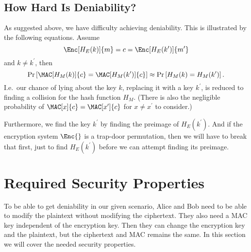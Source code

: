 \subsection{How Hard Is Deniability?}
\label{HardnessOfDeniability}

As suggested above, we have difficulty achieving deniability.
This is illustrated by the following equations.
Assume
\begin{equation*}
  \Enc[H_E(k)]{m} = c = \Enc[H_E(k^\prime)]{m^\prime}
\end{equation*}
and \(k\neq k^\prime\), then
\begin{equation*}
  \Pr\left[
    \MAC[H_M(k)]{c} = \MAC[H_M(k^\prime)]{c}
  \right]
  \approx
  \Pr\left[ H_M(k) = H_M(k^\prime) \right].
\end{equation*}
I.e.~our chance of lying about the key \(k\), replacing it with a key 
\(k^\prime\), is reduced to finding a collision for the hash function \(H_M\).
(There is also the negligible probability of \(\MAC[x]{c} = \MAC[x^\prime]{c}\) 
for \(x\neq x^\prime\) to consider.)

Furthermore, we find the key \(k^\prime\) by finding the preimage of \(H_E( 
k^\prime )\).
And if the encryption system \(\Enc{}\) is a trap-door permutation, then we 
will have to break that first, just to find \(H_E( k^\prime )\) before we can 
attempt finding its preimage.


\section{Required Security Properties}
\label{SecurityProperties}

To be able to get deniability in our given scenario, Alice and Bob need to be 
able to modify the plaintext without modifying the ciphertext.
They also need a \ac{MAC} key independent of the encryption key.
Then they can change the encryption key and the plaintext, but the ciphertext 
and \ac{MAC} remains the same.
In this section we will cover the needed security properties.

